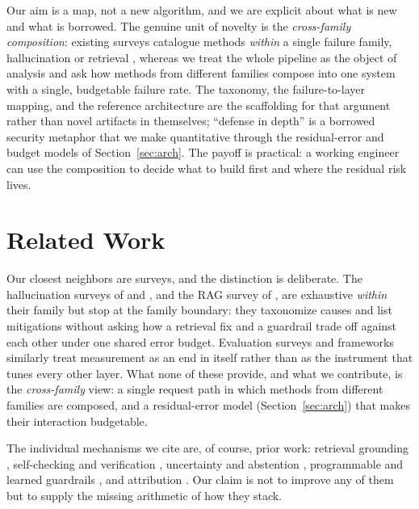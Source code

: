 \documentclass[11pt]{article}
\begin{document}
Our aim is a map, not a new algorithm, and we are explicit about what is new
and what is borrowed. The genuine unit of novelty is the \emph{cross-family
composition}: existing surveys catalogue methods \emph{within} a single failure
family, hallucination \citep{ji2023hallucination,huang2023hallucination} or
retrieval \citep{gao2023ragsurvey}, whereas we treat the whole pipeline as the
object of analysis and ask how methods from different families compose into one
system with a single, budgetable failure rate. The taxonomy, the failure-to-layer
mapping, and the reference architecture are the scaffolding for that argument
rather than novel artifacts in themselves; ``defense in depth'' is a borrowed
security metaphor that we make quantitative through the residual-error and budget
models of Section~\ref{sec:arch}. The payoff is practical: a working engineer can
use the composition to decide what to build first and where the residual risk
lives.

\section{Related Work}
\label{sec:related}

Our closest neighbors are surveys, and the distinction is deliberate. The
hallucination surveys of \citet{ji2023hallucination} and
\citet{huang2023hallucination}, and the RAG survey of \citet{gao2023ragsurvey},
are exhaustive \emph{within} their family but stop at the family boundary: they
taxonomize causes and list mitigations without asking how a retrieval fix and a
guardrail trade off against each other under one shared error budget. Evaluation
surveys and frameworks \citep{liang2023helm,es2023ragas,saadfalcon2024ares}
similarly treat measurement as an end in itself rather than as the instrument
that tunes every other layer. What none of these provide, and what we contribute,
is the \emph{cross-family} view: a single request path in which methods from
different families are composed, and a residual-error model
(Section~\ref{sec:arch}) that makes their interaction budgetable.

The individual mechanisms we cite are, of course, prior work: retrieval
grounding \citep{lewis2020rag}, self-checking and verification
\citep{wang2023selfconsistency,dhuliawala2023cove,manakul2023selfcheckgpt},
uncertainty and abstention
\citep{kadavath2022know,kuhn2023semantic,angelopoulos2021conformal}, programmable
and learned guardrails
\citep{rebedea2023nemo,inan2023llamaguard,bai2022constitutional}, and attribution
\citep{gao2023citations}. Our claim is not to improve any of them but to supply
the missing arithmetic of how they stack.
\end{document}
